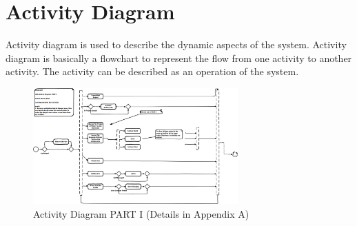 \documentclass[12pt,a4paper]{report}
\begin{document}
\section{Activity Diagram}
Activity diagram is used to describe the dynamic aspects of the system. Activity diagram is basically a flowchart to represent the flow from one activity to another activity. The activity can be described as an operation of the system.
\begin{figure}[H]
	\centering
	\includegraphics[width=0.7\textwidth]{./pics/ActivatyDiagramPARTI.png}
	\caption{Activity Diagram PART I (Details in Appendix A)}
\end{figure}
\end{document}
